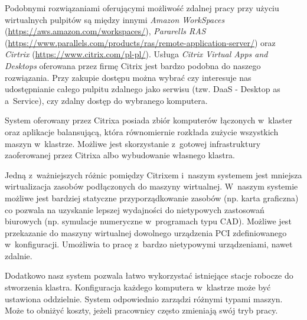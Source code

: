 \documentclass[../wstep.tex]{subfiles}
\begin{document}
Podobnymi rozwiązaniami oferującymi możliwość zdalnej pracy przy użyciu wirtualnych pulpitów są między innymi \textit{Amazon WorkSpaces} (\url{https://aws.amazon.com/workspaces/}), \textit{Pararells RAS} (\url {https://www.parallels.com/products/ras/remote-application-server/}) oraz \textit{Cirtrix} (\url{https://www.citrix.com/pl-pl/}).
Usługa \textit{Citrix Virtual Apps and Desktops} \parencite{citrix-daas} oferowana przez firmę Citrix jest bardzo podobna do naszego rozwiązania.
Przy zakupie dostępu można wybrać czy interesuje nas udostępnianie całego pulpitu zdalnego jako serwisu (tzw. DaaS - Desktop as a~Service), czy zdalny dostęp do wybranego komputera.

System oferowany przez Citrixa posiada zbiór komputerów łączonych w~klaster oraz aplikacje balansującą, która równomiernie rozkłada zużycie wszystkich maszyn w~klastrze.
Możliwe jest skorzystanie z~gotowej infrastruktury zaoferowanej przez Citrixa albo wybudowanie własnego klastra.

Jedną z~ważniejszych różnic pomiędzy Citrixem i~naszym systemem jest mniejsza wirtualizacja zasobów podłączonych do maszyny wirtualnej.
W~naszym systemie możliwe jest bardziej statyczne przyporządkowanie zasobów (np. karta graficzna) co pozwala na uzyskanie lepszej wydajności do nietypowych zastosowań biurowych (np. symulacje numeryczne w~programach typu CAD).
Możliwe jest przekazanie do maszyny wirtualnej dowolnego urządzenia PCI zdefiniowanego w~konfiguracji.
Umożliwia to pracę z~bardzo nietypowymi urządzeniami, nawet zdalnie.

Dodatkowo nasz system pozwala łatwo wykorzystać istniejące stacje robocze do stworzenia klastra.
Konfiguracja każdego komputera w~klastrze może być ustawiona oddzielnie. System odpowiednio zarządzi różnymi typami maszyn.
Może to obniżyć koszty, jeżeli pracownicy często zmieniają swój tryb pracy.
\end{document}
